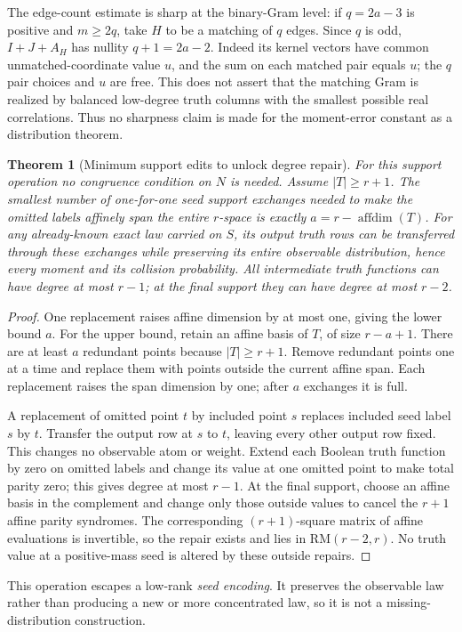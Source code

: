 \documentclass[11pt]{article}
\newtheorem{theorem}{Theorem}[section]
\begin{document}
The edge-count estimate is sharp at the binary-Gram level: if
$q=2a-3$ is positive and $m\ge2q$, take $H$ to be a matching of $q$
edges. Since $q$ is odd, $I+J+A_H$ has nullity $q+1=2a-2$.
Indeed its kernel vectors have common unmatched-coordinate value $u$,
and the sum on each matched pair equals $u$; the $q$ pair choices and
$u$ are free. This does not assert that the matching Gram is realized
by balanced low-degree truth columns with the smallest possible real
correlations. Thus no sharpness claim is made for the moment-error
constant as a distribution theorem.

\begin{theorem}[Minimum support edits to unlock degree repair]
\label{thm:nonlinear-minimum-edits}
For this support operation no congruence condition on $N$ is needed.
Assume $|T|\ge r+1$. The smallest number of one-for-one seed support
exchanges needed to make the omitted labels affinely span the entire
$r$-space is exactly $a=r-\operatorname{affdim}(T)$.
For any already-known exact law carried on $S$, its output truth rows
can be transferred through these exchanges while preserving its entire
observable distribution, hence every moment and its collision probability.
All intermediate truth functions can have degree at most $r-1$; at the
final support they can have degree at most $r-2$.
\end{theorem}
\begin{proof}
One replacement raises affine dimension by at most one, giving the
lower bound $a$. For the upper bound, retain an affine basis of $T$,
of size $r-a+1$. There are at least $a$ redundant points because
$|T|\ge r+1$. Remove redundant points one at a time and replace them
with points outside the current affine span. Each replacement raises
the span dimension by one; after $a$ exchanges it is full.

A replacement of omitted point $t$ by included point $s$ replaces
included seed label $s$ by $t$. Transfer the output row at $s$ to $t$,
leaving every other output row fixed. This changes no observable atom
or weight. Extend each Boolean truth function by zero on omitted labels
and change its value at one omitted point to make total parity zero;
this gives degree at most $r-1$. At the final support, choose an affine
basis in the complement and change only those outside values to cancel
the $r+1$ affine parity syndromes. The corresponding $(r+1)$-square
matrix of affine evaluations is invertible, so the repair exists and
lies in $\mathrm{RM}(r-2,r)$. No truth value at a positive-mass seed is
altered by these outside repairs.
\end{proof}
This operation escapes a low-rank \emph{seed encoding}. It preserves the
observable law rather than producing a new or more concentrated law,
so it is not a missing-distribution construction.
\end{document}
